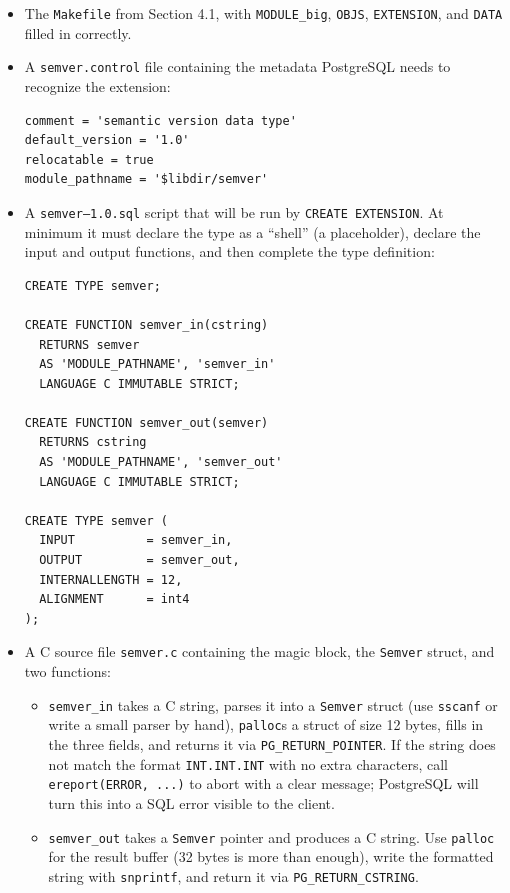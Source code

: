 \documentclass[11pt,a4paper]{article}
\begin{document}
\begin{itemize}
\item The \texttt{Makefile} from Section 4.1, with \texttt{MODULE\_big}, \texttt{OBJS}, \texttt{EXTENSION}, and \texttt{DATA} filled in correctly.

\item A \texttt{semver.control} file containing the metadata PostgreSQL needs to recognize the extension:
\begin{codebox}
\begin{lstlisting}
comment = 'semantic version data type'
default_version = '1.0'
relocatable = true
module_pathname = '$libdir/semver'
\end{lstlisting}
\end{codebox}

\item A \texttt{semver--1.0.sql} script that will be run by \texttt{CREATE EXTENSION}. At minimum it must declare the type as a ``shell'' (a placeholder), declare the input and output functions, and then complete the type definition:
\begin{codebox}
\begin{lstlisting}
CREATE TYPE semver;

CREATE FUNCTION semver_in(cstring)
  RETURNS semver
  AS 'MODULE_PATHNAME', 'semver_in'
  LANGUAGE C IMMUTABLE STRICT;

CREATE FUNCTION semver_out(semver)
  RETURNS cstring
  AS 'MODULE_PATHNAME', 'semver_out'
  LANGUAGE C IMMUTABLE STRICT;

CREATE TYPE semver (
  INPUT          = semver_in,
  OUTPUT         = semver_out,
  INTERNALLENGTH = 12,
  ALIGNMENT      = int4
);
\end{lstlisting}
\end{codebox}

\item A C source file \texttt{semver.c} containing the magic block, the \texttt{Semver} struct, and two functions:
\begin{itemize}
\item \texttt{semver\_in} takes a C string, parses it into a \texttt{Semver} struct (use \texttt{sscanf} or write a small parser by hand), \texttt{palloc}s a struct of size 12 bytes, fills in the three fields, and returns it via \texttt{PG\_RETURN\_POINTER}. If the string does not match the format \texttt{INT.INT.INT} with no extra characters, call \texttt{ereport(ERROR, ...)} to abort with a clear message; PostgreSQL will turn this into a SQL error visible to the client.
\item \texttt{semver\_out} takes a \texttt{Semver} pointer and produces a C string. Use \texttt{palloc} for the result buffer (32 bytes is more than enough), write the formatted string with \texttt{snprintf}, and return it via \texttt{PG\_RETURN\_CSTRING}.
\end{itemize}
\end{itemize}
\end{document}
